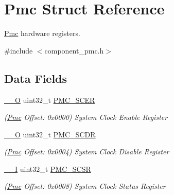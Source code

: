 \hypertarget{structPmc}{}\section{Pmc Struct Reference}
\label{structPmc}


\mbox{\hyperlink{structPmc}{Pmc}} hardware registers.  




{\ttfamily \#include $<$component\+\_\+pmc.\+h$>$}

\subsection*{Data Fields}
\begin{DoxyCompactItemize}
\item 
\mbox{\label{structPmc_a61decac790a8c401d0c56924b1f58971}} 
\mbox{\hyperlink{core__cm7_8h_a7e25d9380f9ef903923964322e71f2f6}{\+\_\+\+\_\+O}} uint32\+\_\+t \mbox{\hyperlink{structPmc_a61decac790a8c401d0c56924b1f58971}{P\+M\+C\+\_\+\+S\+C\+ER}}
\begin{DoxyCompactList}\small\item\em (\mbox{\hyperlink{structPmc}{Pmc}} Offset\+: 0x0000) System Clock Enable Register \end{DoxyCompactList}\item 
\mbox{\label{structPmc_adaaa9676d33659138f0ba43054d9165d}} 
\mbox{\hyperlink{core__cm7_8h_a7e25d9380f9ef903923964322e71f2f6}{\+\_\+\+\_\+O}} uint32\+\_\+t \mbox{\hyperlink{structPmc_adaaa9676d33659138f0ba43054d9165d}{P\+M\+C\+\_\+\+S\+C\+DR}}
\begin{DoxyCompactList}\small\item\em (\mbox{\hyperlink{structPmc}{Pmc}} Offset\+: 0x0004) System Clock Disable Register \end{DoxyCompactList}\item 
\mbox{\label{structPmc_a9ce42b57982403bbd2f713ca5db86826}} 
\mbox{\hyperlink{core__cm7_8h_af63697ed9952cc71e1225efe205f6cd3}{\+\_\+\+\_\+I}} uint32\+\_\+t \mbox{\hyperlink{structPmc_a9ce42b57982403bbd2f713ca5db86826}{P\+M\+C\+\_\+\+S\+C\+SR}}
\begin{DoxyCompactList}\small\item\em (\mbox{\hyperlink{structPmc}{Pmc}} Offset\+: 0x0008) System Clock Status Register \end{DoxyCompactList}\item 

\end{DoxyCompactItemize}

